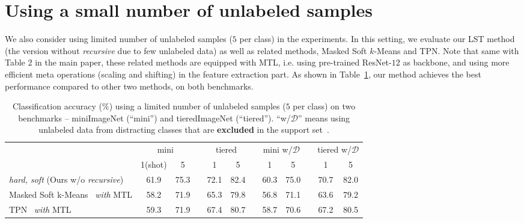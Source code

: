 \documentclass{article}
\begin{document}
\section{Using a small number of unlabeled samples}
\label{sec_fewer_data}

We also consider using limited number of unlabeled samples ($5$ per class) in the experiments.
In this setting, we evaluate our LST method (the version without \emph{recursive} due to few unlabeled data) as well as related methods, Masked Soft $k$-Means and TPN.
Note that same with Table 2 in the main paper, these related methods are equipped with MTL, i.e. using pre-trained ResNet-$12$ as backbone, and using more efficient meta operations (scaling and shifting) in the feature extraction part.
As shown in Table~\ref{table_fewer_un}, our method achieves the best performance compared to other two methods, on both benchmarks.


\begin{table}[h]
\centering
\small
\begin{tabular}{llccccccccccc}
\toprule 
&& \multicolumn{2}{c}{mini}
&& \multicolumn{2}{c}{tiered} && \multicolumn{2}{c}{mini w/$\mathcal{D}$}
&& \multicolumn{2}{c}{tiered w/$\mathcal{D}$} \\
\cmidrule{3-4}\cmidrule{6-7} \cmidrule{9-10}\cmidrule{12-13}
&& 1(shot) & 5 && 1 & 5 && 1 & 5 && 1 & 5 \\
\midrule[1pt]
\multicolumn{2}{l}{\emph{hard, soft} (Ours w/o \emph{recursive})} & 61.9 & 75.3 && 72.1 & 82.4  && 60.3 & 75.0  && 70.7 & 82.0  \\
\midrule[1pt]
\multicolumn{2}{l}{Masked Soft k-Means~\cite{RenICLR2018_semisupervised} \emph{with} MTL} & 58.2 & 71.9  && 65.3 & 79.8 && 56.8 & 71.1 && 63.6 & 79.2  \\
\multicolumn{2}{l}{TPN~\cite{LiuICLR2019transductive} \emph{with} MTL} & 59.3 & 71.9  && 67.4 & 80.7  && 58.7 & 70.6 &&  67.2 & 80.5  \\
\bottomrule[1pt]
\end{tabular}
\vspace{0.1cm}
\caption{Classification accuracy (\%) using a limited number of unlabeled samples ($5$ per class) on two benchmarks -- miniImageNet (``mini'') and tieredImageNet (``tiered''). ``w/$\mathcal{D}$'' means using unlabeled data from distracting classes that are \textbf{excluded} in the support set~\cite{RenICLR2018_semisupervised, LiuICLR2019transductive}.}
\label{table_fewer_un}
\end{table} 
\end{document}
